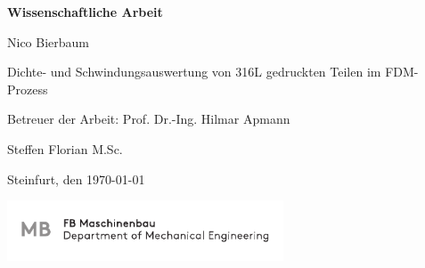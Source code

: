 \begin{minipage}[t]{11cm}
\vspace{4cm}					
\begin{Huge}
\begin{center}\textsf{\textbf{Wissenschaftliche Arbeit}}\end{center}
\end{Huge}


\vspace{2cm} 								
\begin{Large}
\hfill 
\begin{center}

\begin{large}
	Nico Bierbaum
\end{large}

\vspace{2cm} %
\begin{flushright}
	\hfill{Dichte- und Schwindungsauswertung von 316L gedruckten Teilen im FDM-Prozess}\\
\end{flushright}			
\end{center}	
\end{Large}

\begin{large}
\vspace{30mm}  %
\hfill Betreuer der Arbeit: Prof. Dr.-Ing. Hilmar Apmann

\hfill Steffen Florian M.Sc.\\
\end{large}

\vspace{35mm}
\hfill Steinfurt, den \today
\end{minipage}
\vspace{20mm}

\begin{minipage}[t]{136.5mm}
\begin{flushright}
\includegraphics[width=82mm]{bilder/MB_CMYK.pdf}
\end{flushright}
\end{minipage}
\restoregeometry
